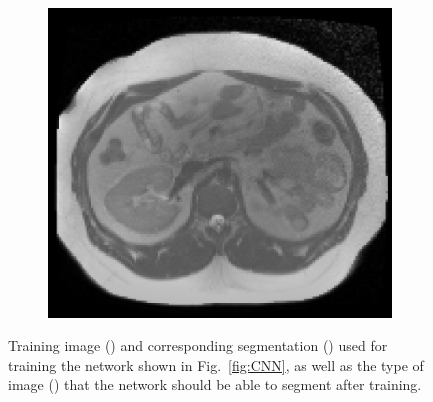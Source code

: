 \documentclass[10pt,twoside]{book}
\begin{document}
\begin{figure}
\begin{subfigure}{0.3\textwidth}
    \caption{}
    \label{fig:CNN_input_b}
  \end{subfigure}
  \begin{subfigure}{0.3\textwidth}
    \centering
    \includegraphics[width=\textwidth]{scenario4_testAutoseg_image}
    \caption{}
    \label{fig:CNN_input_c}
  \end{subfigure}
  \caption{Training image () and corresponding segmentation () used for training the network shown in Fig.~\ref{fig:CNN}, as well as the type of image () that the network should be able to segment after training.}
  \label{fig:CNN_input}
\end{figure}
\end{document}
